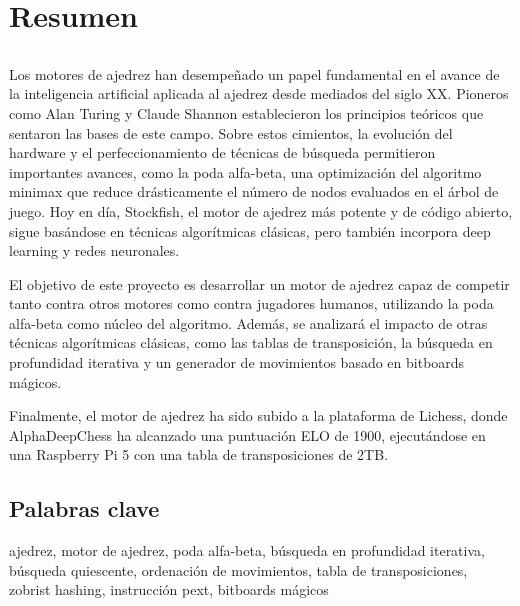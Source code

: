 \chapter*{Resumen}

\section*{\tituloPortadaVal}

Los motores de ajedrez han desempeñado un papel fundamental en el avance de la inteligencia artificial aplicada al ajedrez desde mediados del siglo XX. Pioneros como Alan Turing y Claude Shannon establecieron los principios teóricos que sentaron las bases de este campo. Sobre estos cimientos, la evolución del hardware y el perfeccionamiento de técnicas de búsqueda permitieron importantes avances, como la poda alfa-beta, una optimización del algoritmo minimax que reduce drásticamente el número de nodos evaluados en el árbol de juego. Hoy en día, Stockfish, el motor de ajedrez más potente y de código abierto, sigue basándose en técnicas algorítmicas clásicas, pero también incorpora deep learning y redes neuronales.

\vspace{1em}

El objetivo de este proyecto es desarrollar un motor de ajedrez capaz de competir tanto contra otros motores como contra jugadores humanos, utilizando la poda alfa-beta como núcleo del algoritmo. Además, se analizará el impacto de otras técnicas algorítmicas clásicas, como las tablas de transposición, la búsqueda en profundidad iterativa y un generador de movimientos basado en bitboards mágicos.

\vspace{1em}

Finalmente, el motor de ajedrez ha sido subido a la plataforma de Lichess, donde AlphaDeepChess ha alcanzado una puntuación ELO de 1900, ejecutándose en una Raspberry Pi 5 con una tabla de transposiciones de 2TB.

\section*{Palabras clave}
   
\noindent ajedrez, motor de ajedrez, poda alfa-beta, búsqueda en profundidad iterativa, búsqueda quiescente, ordenación de movimientos, tabla de transposiciones, zobrist hashing, instrucción pext, bitboards mágicos 
